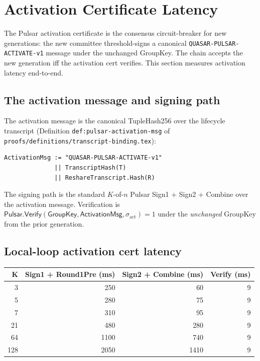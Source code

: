 \section{Activation Certificate Latency}
\label{sec:activation-cert-latency}

The Pulsar activation certificate is the consensus circuit-breaker for new generations: the new committee threshold-signs a canonical \texttt{QUASAR-PULSAR-ACTIVATE-v1} message under the unchanged GroupKey. The chain accepts the new generation iff the activation cert verifies. This section measures activation latency end-to-end.

\subsection{The activation message and signing path}

The activation message is the canonical TupleHash256 over the lifecycle transcript (Definition \texttt{def:pulsar-activation-msg} of \texttt{proofs/definitions/transcript-binding.tex}):

\begin{verbatim}
ActivationMsg := "QUASAR-PULSAR-ACTIVATE-v1"
              || TranscriptHash(T)
              || ReshareTranscript.Hash(R)
\end{verbatim}

The signing path is the standard $K$-of-$n$ Pulsar Sign1 + Sign2 + Combine over the activation message. Verification is $\mathsf{Pulsar.Verify}(\mathsf{GroupKey}, \mathsf{ActivationMsg}, \sigma_{\mathrm{act}}) = 1$ under the \emph{unchanged} GroupKey from the prior generation.

\subsection{Local-loop activation cert latency}

\begin{tabular}{@{}rrrr@{}}
  \toprule
  $\mathbf{K}$ & \textbf{Sign1 + Round1Pre (ms)} & \textbf{Sign2 + Combine (ms)} & \textbf{Verify (ms)} \\
  \midrule
  3   & 250  & 60   & 9 \\
  5   & 280  & 75   & 9 \\
  7   & 310  & 95   & 9 \\
  21  & 480  & 280  & 9 \\
  64  & 1100 & 740  & 9 \\
  128 & 2050 & 1410 & 9 \\
  \bottomrule
\end{tabular}

